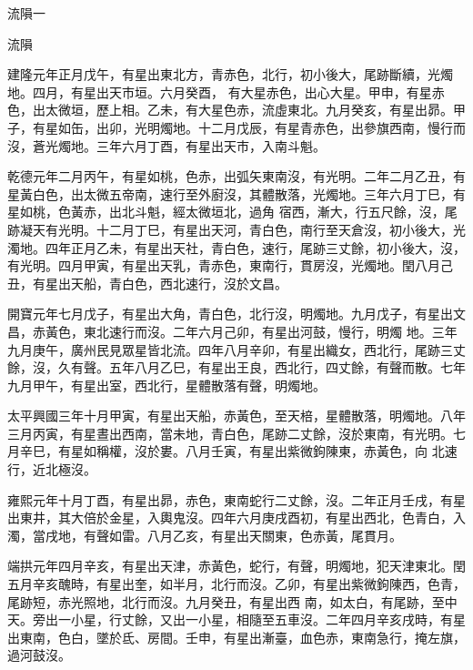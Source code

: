 
\begin{pinyinscope}

 流隕一



 流隕



 建隆元年正月戊午，有星出東北方，青赤色，北行，初小後大，尾跡斷續，光燭地。四月，有星出天市垣。六月癸酉，
 有大星赤色，出心大星。甲申，有星赤色，出太微垣，歷上相。乙未，有大星色赤，流虛東北。九月癸亥，有星出昴。甲子，有星如缶，出卯，光明燭地。十二月戊辰，有星青赤色，出參旗西南，慢行而沒，蒼光燭地。三年六月丁酉，有星出天市，入南斗魁。



 乾德元年二月丙午，有星如桃，色赤，出弧矢東南沒，有光明。二年二月乙丑，有星黃白色，出太微五帝南，速行至外廚沒，其體散落，光燭地。三年六月丁巳，有星如桃，色黃赤，出北斗魁，經太微垣北，過角
 宿西，漸大，行五尺餘，沒，尾跡凝天有光明。十二月丁巳，有星出天河，青白色，南行至天倉沒，初小後大，光濁地。四年正月乙未，有星出天社，青白色，速行，尾跡三丈餘，初小後大，沒，有光明。四月甲寅，有星出天乳，青赤色，東南行，貫房沒，光燭地。閏八月己丑，有星出天船，青白色，西北速行，沒於文昌。



 開寶元年七月戊子，有星出大角，青白色，北行沒，明燭地。九月戊子，有星出文昌，赤黃色，東北速行而沒。二年六月己卯，有星出河鼓，慢行，明燭
 地。三年九月庚午，廣州民見眾星皆北流。四年八月辛卯，有星出織女，西北行，尾跡三丈餘，沒，久有聲。五年八月乙巳，有星出王良，西北行，四丈餘，有聲而散。七年九月甲午，有星出室，西北行，星體散落有聲，明燭地。



 太平興國三年十月甲寅，有星出天船，赤黃色，至天棓，星體散落，明燭地。八年三月丙寅，有星晝出西南，當未地，青白色，尾跡二丈餘，沒於東南，有光明。七月辛巳，有星如稱權，沒於婁。八月壬寅，有星出紫微鉤陳東，赤黃色，向
 北速行，近北極沒。



 雍熙元年十月丁酉，有星出昴，赤色，東南蛇行二丈餘，沒。二年正月壬戌，有星出東井，其大倍於金星，入輿鬼沒。四年六月庚戌酉初，有星出西北，色青白，入濁，當戌地，有聲如雷。八月乙亥，有星出天關東，色赤黃，尾貫月。



 端拱元年四月辛亥，有星出天津，赤黃色，蛇行，有聲，明燭地，犯天津東北。閏五月辛亥醜時，有星出奎，如半月，北行而沒。乙卯，有星出紫微鉤陳西，色青，尾跡短，赤光照地，北行而沒。九月癸丑，有星出西
 南，如太白，有尾跡，至中天。旁出一小星，行丈餘，又出一小星，相隨至五車沒。二年四月辛亥戌時，有星出東南，色白，墜於氐、房間。壬申，有星出漸臺，血色赤，東南急行，掩左旗，過河鼓沒。




\end{pinyinscope}

